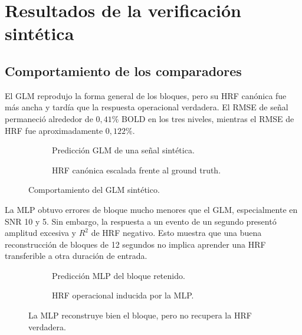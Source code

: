 \chapter{Resultados de la verificación sintética}

\section{Comportamiento de los comparadores}
El GLM reprodujo la forma general de los bloques, pero su HRF canónica fue más ancha y tardía que la respuesta operacional verdadera. El RMSE de señal permaneció alrededor de $0{,}41\%$ BOLD en los tres niveles, mientras el RMSE de HRF fue aproximadamente $0{,}122\%$.

\begin{figure}[H]
\centering
\begin{subfigure}[t]{0.49\textwidth}
\caption{Predicción GLM de una señal sintética.}
\end{subfigure}\hfill
\begin{subfigure}[t]{0.49\textwidth}
\caption{HRF canónica escalada frente al ground truth.}
\end{subfigure}
\caption{Comportamiento del GLM sintético.}
\label{fig:glm_synthetic}
\end{figure}

La MLP obtuvo errores de bloque mucho menores que el GLM, especialmente en SNR 10 y 5. Sin embargo, la respuesta a un evento de un segundo presentó amplitud excesiva y $R^2$ de HRF negativo. Esto muestra que una buena reconstrucción de bloques de 12 segundos no implica aprender una HRF transferible a otra duración de entrada.

\begin{figure}[H]
\centering
\begin{subfigure}[t]{0.49\textwidth}
\caption{Predicción MLP del bloque retenido.}
\end{subfigure}\hfill
\begin{subfigure}[t]{0.49\textwidth}
\caption{HRF operacional inducida por la MLP.}
\end{subfigure}
\caption{La MLP reconstruye bien el bloque, pero no recupera la HRF verdadera.}
\label{fig:mlp_synthetic}
\end{figure}

